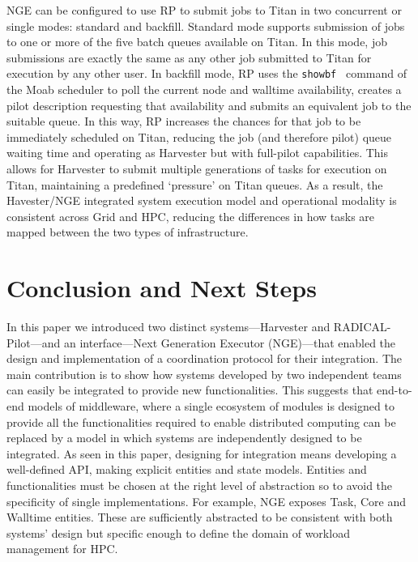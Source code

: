 \documentclass{webofc}
\begin{document}
NGE can be configured to use RP to submit jobs to Titan in two concurrent or
single modes: standard and backfill. Standard mode supports submission of
jobs to one or more of the five batch queues available on Titan. In this
mode, job submissions are exactly the same as any other job submitted to
Titan for execution by any other user. In backfill mode, RP uses the
\texttt{showbf}~\cite{showbf} command of the Moab scheduler to poll the
current node and walltime availability, creates a pilot description
requesting that availability and submits an equivalent job to the suitable
queue. In this way, RP increases the chances for that job to be immediately
scheduled on Titan, reducing the job (and therefore pilot) queue waiting time
and operating as Harvester but with full-pilot capabilities. This allows for
Harvester to submit multiple generations of tasks for execution on Titan,
maintaining a predefined ‘pressure’ on Titan queues. As a result, the
Havester/NGE integrated system execution model and operational modality is
consistent across Grid and HPC, reducing the differences in how tasks are
mapped between the two types of infrastructure.


\section{Conclusion and Next Steps}

In this paper we introduced two distinct systems---Harvester and
RADICAL-Pilot---and an interface---Next Generation Executor (NGE)---that
enabled the design and implementation of a coordination protocol for their
integration. The main contribution is to show how systems developed by two
independent teams can easily be integrated to provide new functionalities.
This suggests that end-to-end models of middleware, where a single ecosystem
of modules is designed to provide all the functionalities required to enable
distributed computing can be replaced by a model in which systems are
independently designed to be integrated. As seen in this paper, designing for
integration means developing a well-defined API, making explicit entities and
state models. Entities and functionalities must be chosen at the right level
of abstraction so to avoid the specificity of single implementations. For
example, NGE exposes Task, Core and Walltime entities. These are sufficiently
abstracted to be consistent with both systems’ design but specific enough to
define the domain of workload management for HPC.
\end{document}
